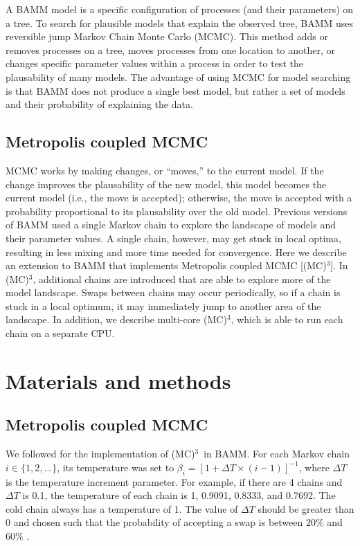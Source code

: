 \documentclass[12pt]{article}
\newcommand{\MCMCMC}{(MC)$^{3}$}
\begin{document}
A BAMM model is a specific configuration of processes
(and their parameters) on a tree.
%
To search for plausible models that explain the observed tree,
BAMM uses reversible jump Markov Chain Monte Carlo (MCMC).
%
This method adds or removes processes on a tree,
moves processes from one location to another,
or changes specific parameter values within a process
in order to test the plausability of many models.
%
The advantage of using MCMC for model searching
is that BAMM does not produce a single best model,
but rather a set of models and their probability of explaining the data.


\subsection*{Metropolis coupled MCMC}

MCMC works by making changes, or ``moves,'' to the current model.
%
If the change improves the plausability of the new model,
this model becomes the current model (i.e., the move is accepted);
otherwise, the move is accepted with a probability
proportional to its plausability over the old model.
%
Previous versions of BAMM used a single Markov chain
to explore the landscape of models and their parameter values.
%
A single chain, however, may get stuck in local optima,
resulting in less mixing and more time needed for convergence.
%
Here we describe an extension to BAMM
that implements Metropolis coupled MCMC [\MCMCMC].
%
In \MCMCMC, additional chains are introduced
that are able to explore more of the model landscape.
%
Swaps between chains may occur periodically,
so if a chain is stuck in a local optimum,
it may immediately jump to another area of the landscape.
%
In addition, we describe multi-core \MCMCMC,
which is able to run each chain on a separate CPU.


\section*{Materials and methods}

\subsection*{Metropolis coupled MCMC}

We followed \citet{alt04} for the implementation of \MCMCMC\ in BAMM.
%
For each Markov chain $i \in \{1, 2, \dots\}$, its temperature was set to
$\beta_i = [1 + \Delta T \times (i - 1)]^{-1}$,
where $\Delta T$ is the temperature increment parameter.
%
For example, if there are 4 chains and $\Delta T$ is 0.1,
the temperature of each chain is 1, 0.9091, 0.8333, and 0.7692.
%
The cold chain always has a temperature of 1.
%
The value of $\Delta T$ should be greater than 0
and chosen such that the probability of accepting a swap
is between 20\% and 60\% \citep{alt04}.
\end{document}
